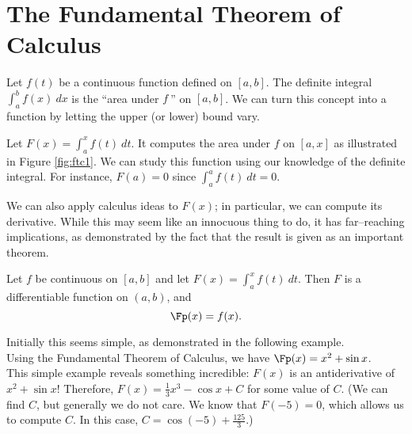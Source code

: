 \section{The Fundamental Theorem of Calculus}\label{sec:FTC}

Let $f(t)$ be a continuous function defined on $[a,b]$. The definite integral $\int_a^b f(x)\ dx$ is the ``area under $f\ $'' on $[a,b]$. We can turn this concept into a function by letting the upper (or lower) bound vary.

Let $F(x) = \int_a^x f(t)\ dt$. It computes the area under $f$ on $[a,x]$ as illustrated in Figure \ref{fig:ftc1}. We can study this function using our knowledge of the definite integral. For instance, $F(a)=0$ since $\int_a^af(t)\ dt=0$. %


We can also apply calculus ideas to $F(x)$; in particular, we can compute its derivative. While this may seem like an innocuous thing to do, it has far--reaching implications, as demonstrated by the fact that the result is given as an important theorem.

{Let $f$ be continuous on $[a,b]$ and let $F(x) = \int_a^x f(t)\ dt$. Then $F$ is a differentiable function on $(a,b)$, and 
\[
\Fp(x)=f(x).
\]
}

Initially this seems simple, as demonstrated in the following example.\\

{Using the Fundamental Theorem of Calculus, we have $\Fp(x) = x^2+\sin x$.
}\\

This simple example reveals something incredible: $F(x)$ is an antiderivative of $x^2+\sin x$! Therefore, $F(x) = \frac13x^3-\cos x+C$ for some value of $C$. (We can find $C$, but generally we do not care. We know that $F(-5)=0$, which allows us to compute $C$. In this case, $C=\cos(-5)+\frac{125}3$.)

